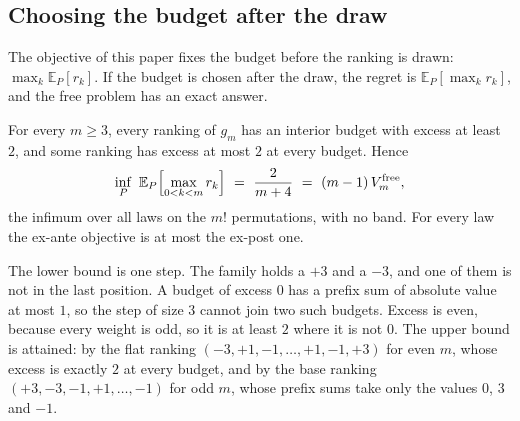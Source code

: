 

\subsection{Choosing the budget after the draw}
\label{sec:expost}

The objective of this paper fixes the budget before the ranking is drawn:
$\max_{k}\mathbb{E}_{P}[r_{k}]$. If the budget is chosen after the draw, the regret is
$\mathbb{E}_{P}[\max_{k}r_{k}]$, and the free problem has an exact answer.

\begin{theorem}
\label{thm:expost}
For every $m\ge3$, every ranking of $g_{m}$ has an interior budget with excess at least $2$,
and some ranking has excess at most $2$ at every budget. Hence
\[
\inf_{P}\ \mathbb{E}_{P}\Bigl[\max_{0<k<m}r_{k}\Bigr]\ =\ \frac{2}{m+4}
\ =\ (m-1)\,V^{\mathrm{free}}_{m},
\]
the infimum over all laws on the $m!$ permutations, with no band. For every law the ex-ante
objective is at most the ex-post one.
\end{theorem}

The lower bound is one step. The family holds a $+3$ and a $-3$, and one of them is not in the
last position. A budget of excess $0$ has a prefix sum of absolute value at most $1$, so the
step of size $3$ cannot join two such budgets. Excess is even, because every weight is odd,
so it is at least $2$ where it is not $0$. The upper bound is attained: by the flat ranking
$(-3,+1,-1,\dots,+1,-1,+3)$ for even $m$, whose excess is exactly $2$ at every budget, and by
the base ranking $(+3,-3,-1,+1,\dots,-1)$ for odd $m$, whose prefix sums take only the
values $0$, $3$ and $-1$.


